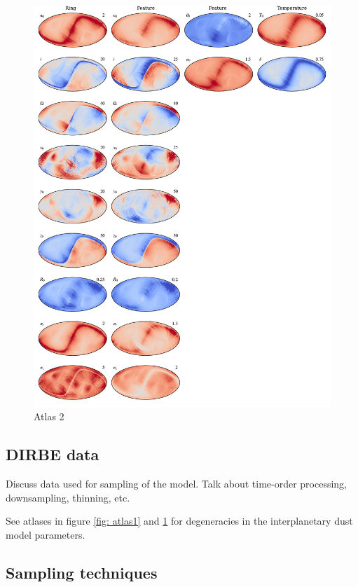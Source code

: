 \documentclass{aa}
\begin{document}
\begin{figure}
    \centering
         \includegraphics[width=0.8\linewidth]{figs/atlas_2_v2.pdf}
        \caption{Atlas 2}
      \label{fig: atlas2}
  \end{figure}


\subsection{DIRBE data}
Discuss data used for sampling of the model. Talk about time-order processing, downsampling, thinning, etc.

See atlases in figure \ref{fig: atlas1} and \ref{fig: atlas2} for degeneracies in the interplanetary dust model parameters.

\subsection{Sampling techniques}
\end{document}
